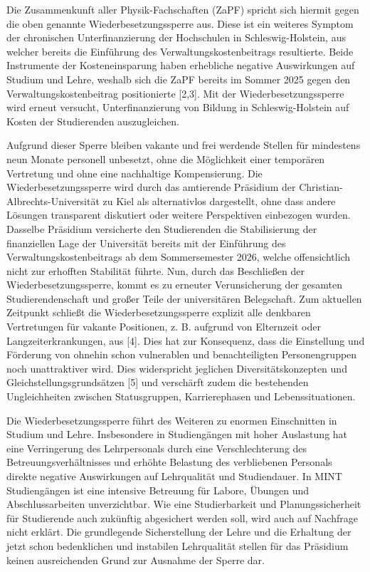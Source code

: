 \documentclass[DIV=calc]{scrartcl}
\begin{document}
Die Zusammenkunft aller Physik-Fachschaften (ZaPF) spricht sich hiermit gegen die oben genannte Wiederbesetzungssperre aus. Diese ist ein weiteres Symptom der chronischen Unterfinanzierung der 
Hochschulen in Schleswig-Holstein, aus welcher bereits die Einführung des Verwaltungskostenbeitrags 
resultierte. Beide Instrumente der Kosteneinsparung haben erhebliche negative Auswirkungen auf 
Studium und Lehre, weshalb sich die ZaPF bereits im Sommer 2025 gegen den Verwaltungskostenbeitrag 
positionierte [2,3]. Mit der Wiederbesetzungssperre wird erneut versucht, Unterfinanzierung von Bildung 
in Schleswig-Holstein auf Kosten der Studierenden auszugleichen. 

Aufgrund dieser Sperre bleiben vakante und frei werdende Stellen für mindestens neun Monate personell 
unbesetzt, ohne die Möglichkeit einer temporären Vertretung und ohne eine nachhaltige Kompensierung. 
Die Wiederbesetzungssperre wird durch das amtierende Präsidium der Christian-Albrechts-Universität zu 
Kiel als alternativlos dargestellt, ohne dass andere Lösungen transparent diskutiert oder weitere 
Perspektiven einbezogen wurden. Dasselbe Präsidium versicherte den Studierenden die Stabilisierung der 
finanziellen Lage der Universität bereits mit der Einführung des Verwaltungskostenbeitrags ab dem 
Sommersemester 2026, welche offensichtlich nicht zur erhofften Stabilität führte. Nun, durch das 
Beschließen der Wiederbesetzungssperre, kommt es zu erneuter Verunsicherung der gesamten 
Studierendenschaft und großer Teile der universitären Belegschaft.
Zum aktuellen Zeitpunkt schließt die Wiederbesetzungssperre explizit alle denkbaren Vertretungen für 
vakante Positionen, z. B. aufgrund von Elternzeit oder Langzeiterkrankungen, aus [4]. Dies hat zur 
Konsequenz, dass die Einstellung und Förderung von ohnehin schon vulnerablen und benachteiligten 
Personengruppen noch unattraktiver wird. Dies widerspricht jeglichen Diversitätskonzepten und 
Gleichstellungsgrundsätzen [5] und verschärft zudem die bestehenden Ungleichheiten zwischen 
Statusgruppen, Karrierephasen und Lebenssituationen.

Die Wiederbesetzungssperre führt des Weiteren zu enormen Einschnitten in Studium und Lehre. Insbesondere in Studiengängen mit hoher Auslastung hat eine Verringerung des Lehrpersonals durch eine 
Verschlechterung des Betreuungsverhältnisses und erhöhte Belastung des verbliebenen Personals direkte 
negative Auswirkungen auf Lehrqualität und Studiendauer. In MINT Studiengängen ist eine intensive 
Betreuung für Labore, Übungen und Abschlussarbeiten unverzichtbar. Wie eine Studierbarkeit und 
Planungssicherheit für Studierende auch zukünftig abgesichert werden soll, wird auch auf Nachfrage nicht 
erklärt. Die grundlegende Sicherstellung der Lehre und die Erhaltung der jetzt schon bedenklichen und 
instabilen Lehrqualität stellen für das Präsidium keinen ausreichenden Grund zur Ausnahme der Sperre dar.
\end{document}
